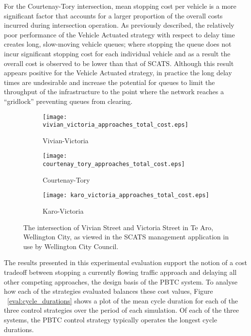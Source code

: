 For the Courtenay-Tory intersection, mean stopping cost per vehicle is a more significant factor that accounts for a larger proportion of the overall costs incurred during intersection operation. As previously described, the relatively poor performance of the Vehicle Actuated strategy with respect to delay time creates long, slow-moving vehicle queues; where stopping the queue does not incur significant stopping cost for each individual vehicle and as a result the overall cost is observed to be lower than that of SCATS. Although this result appears positive for the Vehicle Actuated strategy, in practice the long delay times are undesirable and increase the potential for queues to limit the throughput of the infrastructure to the point where the network reaches a ``gridlock'' preventing queues from clearing. 

\begin{figure}
\centering
\begin{subfigure}{.5\textwidth}
  \centering
  \texttt{[image: vivian\_victoria\_approaches\_total\_cost.eps]}
  \caption{Vivian-Victoria}
  \label{total_cost:sub1}
\end{subfigure}%
\begin{subfigure}{.5\textwidth}
  \centering
  \texttt{[image: courtenay\_tory\_approaches\_total\_cost.eps]}
  \caption{Courtenay-Tory}
  \label{total_cost:sub2}
\end{subfigure}

\vspace{1cm}

\begin{subfigure}{.5\textwidth}
  \centering
  \texttt{[image: karo\_victoria\_approaches\_total\_cost.eps]}
  \caption{Karo-Victoria}
  \label{total_cost:sub3}
\end{subfigure}%
\caption{The intersection of Vivian Street and Victoria Street in Te Aro, Wellington City, as viewed in the SCATS management application in use by Wellington City Council. }
\label{eval:total_cost}
\end{figure}

The results presented in this experimental evaluation support the notion of a cost tradeoff between stopping a currently flowing traffic approach and delaying all other competing approaches, the design basis of the PBTC system. To analyse how each of the strategies evaluated balances these cost values, Figure ~\ref{eval:cycle_durations} shows a plot of the mean cycle duration for each of the three control strategies over the period of each simulation. Of each of the three systems, the PBTC control strategy typically operates the longest cycle durations.

